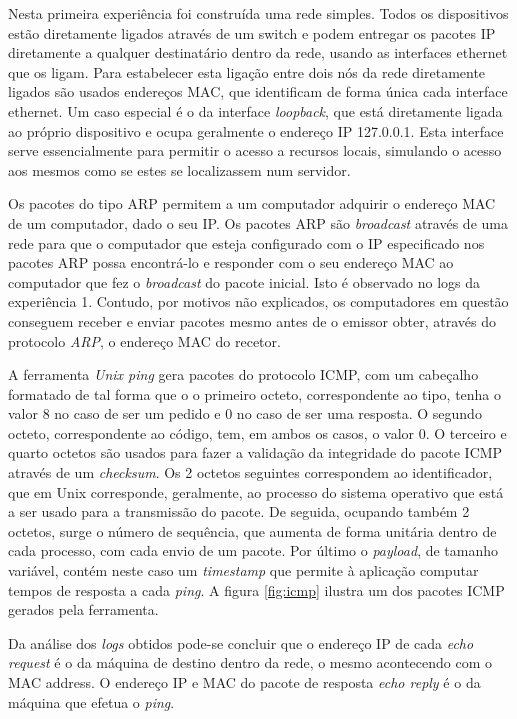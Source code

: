\documentclass{article}
\begin{document}
Nesta primeira experiência foi construída uma rede simples. Todos os dispositivos estão diretamente ligados através de um switch e podem entregar os pacotes IP diretamente a qualquer destinatário dentro da rede, usando as interfaces ethernet que os ligam. Para estabelecer esta ligação entre dois nós da rede diretamente ligados são usados endereços MAC, que identificam de forma única cada interface ethernet. Um caso especial é o da interface \textit{loopback}, que está diretamente ligada ao próprio dispositivo e ocupa geralmente o endereço IP 127.0.0.1. Esta interface serve essencialmente para permitir o acesso a recursos locais, simulando o acesso aos mesmos como se estes se localizassem num servidor.

Os pacotes do tipo ARP permitem a um computador adquirir o endereço MAC de um computador, dado o seu IP. Os pacotes ARP são \textit{broadcast} através de uma rede para que o computador que esteja configurado com o IP especificado nos pacotes ARP possa encontrá-lo e responder com o seu endereço MAC ao computador que fez o \textit{broadcast} do pacote inicial. Isto é observado no logs da experiência 1. Contudo, por motivos não explicados, os computadores em questão conseguem receber e enviar pacotes mesmo antes de o emissor obter, através do protocolo \textit{ARP}, o endereço MAC do recetor.

A ferramenta \textit{Unix ping} gera pacotes do protocolo ICMP, com um cabeçalho formatado de tal forma que o o primeiro octeto, correspondente ao tipo, tenha o valor 8 no caso de ser um pedido e 0 no caso de ser uma resposta. O segundo octeto, correspondente ao código, tem, em ambos os casos, o valor 0. O terceiro e quarto octetos são usados para fazer a validação da integridade do pacote ICMP através de um \textit{checksum}. Os 2 octetos seguintes correspondem ao identificador, que em Unix corresponde, geralmente, ao processo do sistema operativo que está a ser usado para a transmissão do pacote. De seguida, ocupando também 2 octetos, surge o número de sequência, que aumenta de forma unitária dentro de cada processo, com cada envio de um pacote. Por último o \textit{payload}, de tamanho variável, contém neste caso um \textit{timestamp} que permite à aplicação computar tempos de resposta a cada \textit{ping}. A figura \ref{fig:icmp} ilustra um dos pacotes ICMP gerados pela ferramenta.

Da análise dos \textit{logs} obtidos pode-se concluir que o endereço IP de cada \textit{echo request} é o da máquina de destino dentro da rede, o mesmo acontecendo com o MAC address. O endereço IP e MAC do pacote de resposta \textit{echo reply} é o da máquina que efetua o \textit{ping}.
\end{document}

